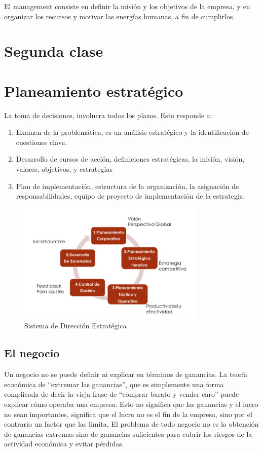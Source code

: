 \documentclass[titlepage,a4paper]{article}
\begin{document}
El management consiste en definir la misión y los objetivos de la empresa, y en organizar los recursos y motivar las energías humanas, a fin de cumplirlos.




\section*{Segunda clase}
\section{Planeamiento estratégico}
La toma de decisiones, involucra todos los plazos. Esto responde a:
\begin{enumerate}
    \item Examen de la problemática, es un análisis estratégico y la identificación de cuestiones clave.
    \item Desarrollo de cursos de acción, definiciones estratégicas, la misión, visión, valores, objetivos, y estrategias
    \item Plan de implementación, estructura de la organización, la asignación de responsabilidades, equipo de proyecto de implementación de la estrategia.
\end{enumerate}

\begin{figure}[!htb]
    \centering
    \includegraphics[width=0.8\textwidth]{imagenes/DireccionEstrategica.PNG}
    \caption{Sistema de Dirección Estratégica}
\end{figure}

\subsection{El negocio}
Un negocio no se puede definir ni explicar en términos de ganancias. La teoría económica de “extremar las ganancias”, que es simplemente una forma complicada de decir la vieja frase de “comprar barato y vender caro” puede explicar cómo operaba una empresa. Esto no significa que las ganancias y el lucro no sean importantes, significa que el lucro no es el fin de la empresa, sino por el contrario un factor que las limita. 
El problema de todo negocio no es la obtención de ganancias extremas sino de ganancias suficientes para cubrir los riesgos de la actividad económica y evitar pérdidas. 
\end{document}
